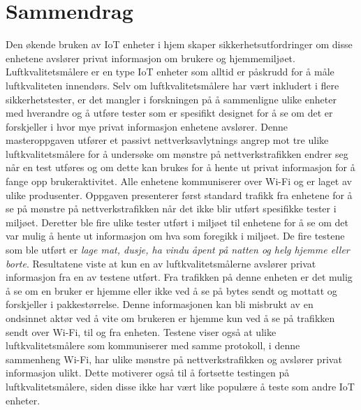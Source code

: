 \chapter*{Sammendrag}
Den økende bruken av IoT enheter i hjem skaper sikkerhetsutfordringer om disse enhetene avslører privat informasjon om brukere og hjemmemiljøet. Luftkvalitetsmålere er en type IoT enheter som alltid er påskrudd for å måle luftkvaliteten innendørs. Selv om luftkvalitetsmålere har vært inkludert i flere sikkerhetstester, er det mangler i forskningen på å sammenligne ulike enheter med hverandre og å utføre tester som er spesifikt designet for å se om det er forskjeller i hvor mye privat informasjon enhetene avslører. Denne masteroppgaven utfører et passivt nettverksavlytnings angrep mot tre ulike luftkvalitetsmålere for å undersøke om mønstre på nettverkstrafikken endrer seg når en test utføres og om dette kan brukes for å hente ut privat informasjon for å fange opp brukeraktivitet. Alle enhetene kommuniserer over Wi-Fi og er laget av ulike produsenter. Oppgaven presenterer først standard trafikk fra enhetene for å se på mønstre på nettverkstrafikken når det ikke blir utført spesifikke tester i miljøet. Deretter ble fire ulike tester utført i miljøet til enhetene for å se om det var mulig å hente ut informasjon om hva som foregikk i miljøet. De fire testene som ble utført er \textit{lage mat, dusje, ha vindu åpent på natten og helg hjemme eller borte}. Resultatene viste at kun en av luftkvalitetsmålerne avslører privat informasjon fra en av testene utført. Fra trafikken på denne enheten er det mulig å se om en bruker er hjemme eller ikke ved å se på bytes sendt og mottatt og forskjeller i pakkestørrelse. Denne informasjonen kan bli misbrukt av en ondsinnet aktør ved å vite om brukeren er hjemme kun ved å se på trafikken sendt over Wi-Fi, til og fra enheten. Testene viser også at ulike luftkvalitetsmålere som kommuniserer med samme protokoll, i denne sammenheng Wi-Fi, har ulike mønstre på nettverkstrafikken og avslører privat informasjon ulikt. Dette motiverer også til å fortsette testingen på luftkvalitetsmålere, siden disse ikke har vært like populære å teste som andre IoT enheter. 